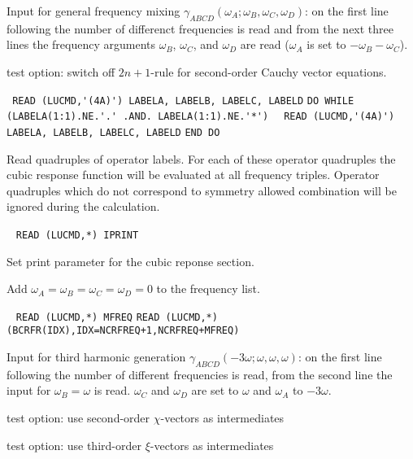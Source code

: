\begin{description}
Input for general frequency mixing
$\gamma_{ABCD}(\omega_A;\omega_B,\omega_C,\omega_D)$: on the first line
following  the number of differenct frequencies
is read and from the next three lines the frequency arguments 
$\omega_B$, $\omega_C$, and $\omega_D$ are read
($\omega_A$ is set to $-\omega_B-\omega_C$).
                                                           
\item[\Key{NO2NP1}] test option: switch off $2n+1$-rule for second-order
                    Cauchy vector equations.
 
\item[\Key{OPERAT}] \verb| |\newline
\verb|READ (LUCMD,'(4A)') LABELA, LABELB, LABELC, LABELD|\newline
\verb|DO WHILE (LABELA(1:1).NE.'.' .AND. LABELA(1:1).NE.'*')|\newline
\verb|  READ (LUCMD,'(4A)') LABELA, LABELB, LABELC, LABELD|\newline
\verb|END DO|

Read quadruples of operator labels.
For each of these operator quadruples the cubic response
function will be evaluated at all frequency triples.
Operator quadruples which do not correspond to symmetry allowed
combination will be ignored during the calculation. 

\item[\Key{PRINT}] \verb| |\newline
\verb|READ (LUCMD,*) IPRINT|

Set print parameter for the cubic reponse section.

\item[\Key{STATIC}] 
Add $\omega_A = \omega_B = \omega_C = \omega_D = 0$ to the frequency list.

\item[\Key{THGFRE}] \verb| |\newline
\verb|READ (LUCMD,*) MFREQ|\newline
\verb|READ (LUCMD,*) (BCRFR(IDX),IDX=NCRFREQ+1,NCRFREQ+MFREQ)|

Input for third harmonic generation
$\gamma_{ABCD}(-3\omega;\omega,\omega,\omega)$:
on the first line following  the number of different
frequencies is read, from the second line the input for
$\omega_B = \omega$ is read. $\omega_C$ and $\omega_D$ are set to 
$\omega$ and $\omega_A$ to $-3\omega$. 
 
\item[\Key{USECHI}]
test option: use second-order $\chi$-vectors as intermediates
 
\item[\Key{USEXKS}] 
test option: use third-order $\xi$-vectors as intermediates
 
%

\end{description}

